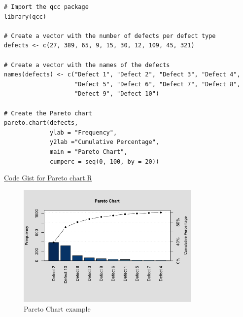 \begin{lstlisting}
# Import the qcc package
library(qcc)                  

# Create a vector with the number of defects per defect type
defects <- c(27, 389, 65, 9, 15, 30, 12, 109, 45, 321)            

# Create a vector with the names of the defects 
names(defects) <- c("Defect 1", "Defect 2", "Defect 3", "Defect 4",
                    "Defect 5", "Defect 6", "Defect 7", "Defect 8",
                    "Defect 9", "Defect 10")   

# Create the Pareto chart
pareto.chart(defects,
             ylab = "Frequency",
             y2lab ="Cumulative Percentage",
             main = "Pareto Chart",
             cumperc = seq(0, 100, by = 20))
\end{lstlisting}
\href{https://gist.githubusercontent.com/rsalaza4/a69615daba7c7c56290838b46cc121cc/raw/974774009f38d6af534168f2a324ce2b3c61d632/Pareto\%20chart.R}{Code Gist for Pareto chart.R}
\begin{figure}[htbp!]
    \centering
    \includegraphics[width=0.8\textwidth]{images/Pareto_chart_example.png}
    \caption{Pareto Chart example}
    \label{fig:pareto_chart_example}
\end{figure}

